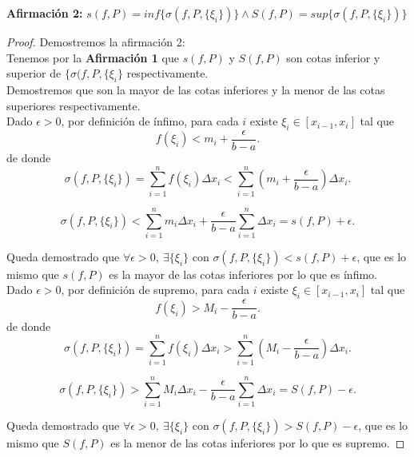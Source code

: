 \documentclass{article}
\begin{document}
\textbf{Afirmación 2:} \(s(f, P) = inf\{\sigma(f, P,\{\xi_i\})\} \wedge S(f, P) = sup\{\sigma(f, P,\{\xi_i\})\}\)
\begin{proof}
Demostremos la afirmación 2:\\

Tenemos por la \textbf{Afirmación 1} que \(s(f, P)\) y \(S(f,P)\) son cotas inferior y superior de \(\{\sigma(f, P,\{\xi_i\}\) respectivamente.\\

 Demostremos que son la mayor de las cotas inferiores y la menor de las cotas superiores respectivamente.\\

Dado \(\epsilon > 0\), por definición de ínfimo, para cada \(i\) existe \(\xi_i \in [x_{i-1}, x_i]\) tal que
\[
f(\xi_i) < m_i + \frac{\epsilon}{b - a}.
\]
de donde
\[
\sigma(f, P, \{\xi_i\}) = \sum_{i=1}^n f(\xi_i) \Delta x_i < \sum_{i=1}^n \left(m_i + \frac{\epsilon}{b - a}\right) \Delta x_i.
\]

\[
\sigma(f, P, \{\xi_i\}) < \sum_{i=1}^n m_i \Delta x_i+ \frac{\epsilon}{b - a} \sum_{i=1}^n \Delta x_i = s(f, P) + \epsilon.
\]

Queda demostrado que 
   \( \forall \epsilon > 0,\ \exists \{\xi_i\} \) con \( \sigma(f, P, \{\xi_i\}) < s(f, P) + \epsilon \), que es lo mismo que \(s(f, P)\) es la mayor de las cotas inferiores por lo que es ínfimo.\\

Dado \(\epsilon > 0\), por definición de supremo, para cada \(i\) existe \(\xi_i \in [x_{i-1}, x_i]\) tal que
\[
f(\xi_i) > M_i - \frac{\epsilon}{b - a}.
\]
de donde
\[
\sigma(f, P, \{\xi_i\}) = \sum_{i=1}^n f(\xi_i) \Delta x_i > \sum_{i=1}^n \left(M_i - \frac{\epsilon}{b - a}\right) \Delta x_i.
\]

\[
\sigma(f, P, \{\xi_i\}) > \sum_{i=1}^n M_i \Delta x_i - \frac{\epsilon}{b - a} \sum_{i=1}^n \Delta x_i = S(f, P) - \epsilon.
\]

Queda demostrado que 
   \( \forall \epsilon > 0,\ \exists \{\xi_i\} \) con \( \sigma(f, P, \{\xi_i\}) > S(f, P) - \epsilon \), que es lo mismo que \(S(f, P)\) es la menor de las cotas inferiores por lo que es supremo.




\end{proof}
\end{document}
